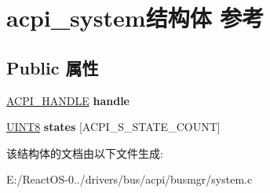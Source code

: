 \hypertarget{structacpi__system}{}\section{acpi\+\_\+system结构体 参考}
\label{structacpi__system}
\subsection*{Public 属性}
\begin{DoxyCompactItemize}
\item 
\mbox{\label{structacpi__system_aa2cc8a79dff62aabccaf96ef10d176a0}} 
\hyperlink{interfacevoid}{A\+C\+P\+I\+\_\+\+H\+A\+N\+D\+LE} {\bfseries handle}
\item 
\mbox{\label{structacpi__system_a3f36f3800d395be7ddac8069cb55e12a}} 
\hyperlink{_processor_bind_8h_ab27e9918b538ce9d8ca692479b375b6a}{U\+I\+N\+T8} {\bfseries states} \mbox{[}A\+C\+P\+I\+\_\+\+S\+\_\+\+S\+T\+A\+T\+E\+\_\+\+C\+O\+U\+NT\mbox{]}
\end{DoxyCompactItemize}


该结构体的文档由以下文件生成\+:\begin{DoxyCompactItemize}
\item 
E\+:/\+React\+O\+S-\/0../drivers/bus/acpi/busmgr/system.\+c\end{DoxyCompactItemize}
